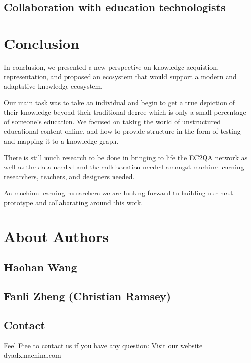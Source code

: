 \documentclass[]{book}
\theoremstyle{definition}
\theoremstyle{definition}
\theoremstyle{definition}
\theoremstyle{remark}
\begin{document}
\section{Collaboration with education
technologists}\label{collaboration-with-education-technologists}

\chapter{Conclusion}\label{conclusion}

In conclusion, we presented a new perspective on knowledge acquistion,
representation, and proposed an ecosystem that would support a modern
and adaptative knowledge ecosystem.

Our main task was to take an individual and begin to get a true
depiction of their knowledge beyond their traditional degree which is
only a small percentage of someone's education. We focused on taking the
world of unstructured educational content online, and how to provide
structure in the form of testing and mapping it to a knowledge graph.

There is still much research to be done in bringing to life the EC2QA
network as well as the data needed and the collaboration needed amongst
machine learning researchers, teachers, and designers needed.

As machine learning researchers we are looking forward to building our
next prototype and collaborating around this work.

\chapter{About Authors}\label{about-authors}

\section{Haohan Wang}\label{haohan-wang}

\section{Fanli Zheng (Christian
Ramsey)}\label{fanli-zheng-christian-ramsey}

\section{Contact}\label{contact}

Feel Free to contact us if you have any question: Visit our website
dyadxmachina.com
\end{document}
